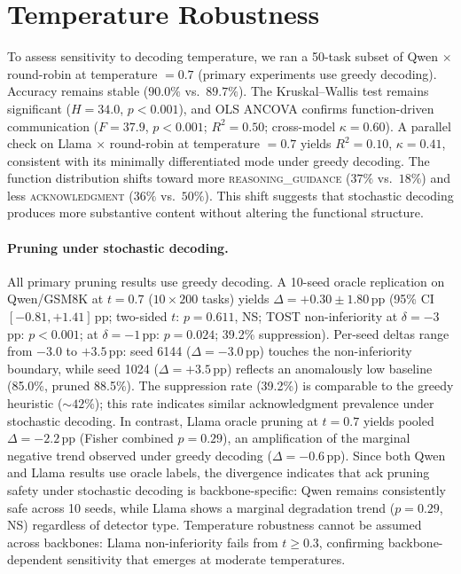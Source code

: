 \section{Temperature Robustness}
\label{app:temp-robustness}

To assess sensitivity to decoding temperature, we ran a 50-task subset of Qwen $\times$ round-robin at temperature $= 0.7$ (primary experiments use greedy decoding). Accuracy remains stable ($90.0\%$ vs.\ $89.7\%$). The Kruskal--Wallis test remains significant ($H = 34.0$, $p < 0.001$), and OLS ANCOVA confirms function-driven communication ($F = 37.9$, $p < 0.001$; $R^2 = 0.50$; cross-model $\kappa = 0.60$). A parallel check on Llama $\times$ round-robin at temperature $= 0.7$ yields $R^2 = 0.10$, $\kappa = 0.41$, consistent with its minimally differentiated mode under greedy decoding. The function distribution shifts toward more \textsc{reasoning\_guidance} ($37\%$ vs.\ $18\%$) and less \textsc{acknowledgment} ($36\%$ vs.\ $50\%$). This shift suggests that stochastic decoding produces more substantive content without altering the functional structure.

\paragraph{Pruning under stochastic decoding.}
All primary pruning results use greedy decoding. A 10-seed oracle replication on Qwen/GSM8K at $t{=}0.7$ ($10 \times 200$ tasks) yields $\Delta = +0.30 \pm 1.80$\,pp (95\% CI $[-0.81, +1.41]$\,pp; two-sided $t$: $p = 0.611$, NS; TOST non-inferiority at $\delta = -3$\,pp: $p < 0.001$; at $\delta = -1$\,pp: $p = 0.024$; 39.2\% suppression). Per-seed deltas range from $-3.0$ to $+3.5$\,pp: seed 6144 ($\Delta = -3.0$\,pp) touches the non-inferiority boundary, while seed 1024 ($\Delta = +3.5$\,pp) reflects an anomalously low baseline (85.0\%, pruned 88.5\%). The suppression rate (39.2\%) is comparable to the greedy heuristic (${\sim}42\%$); this rate indicates similar acknowledgment prevalence under stochastic decoding. In contrast, Llama oracle pruning at $t{=}0.7$ yields pooled $\Delta = -2.2$\,pp (Fisher combined $p = 0.29$), an amplification of the marginal negative trend observed under greedy decoding ($\Delta = -0.6$\,pp). Since both Qwen and Llama results use oracle labels, the divergence indicates that ack pruning safety under stochastic decoding is backbone-specific: Qwen remains consistently safe across 10 seeds, while Llama shows a marginal degradation trend ($p = 0.29$, NS) regardless of detector type. Temperature robustness cannot be assumed across backbones: Llama non-inferiority fails from $t{\geq}0.3$, confirming backbone-dependent sensitivity that emerges at moderate temperatures.

